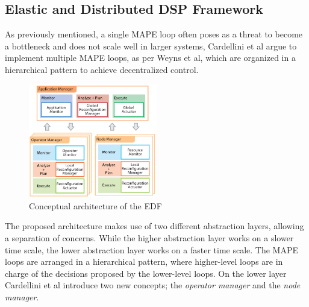         \subsection{Elastic and Distributed DSP Framework}
        \label{sub:edf}
        As previously mentioned, a single MAPE loop often poses as a threat to become a bottleneck and does not scale well in larger systems\cite{cardellini}\cite{Cheng:2009:SES:1573856.1573858},
        Cardellini et al argue to implement multiple MAPE loops, as per Weyns et al\cite{Weyns2013}, which are organized in a hierarchical pattern to achieve decentralized control.
        \begin{figure}[hbt]
            \centering
            \includegraphics[width=0.5\textwidth]{Bilder/hierarchical.png}
            \caption{
                    Conceptual architecture of the EDF\cite{cardellini}
            }
            \label{fig:hierarchical}
        \end{figure}
        The proposed architecture makes use of two different abstraction layers, allowing a separation of concerns. 
        While the higher abstraction layer works on a slower time scale, the lower abstraction layer works on a faster time scale.
        The MAPE loops are arranged in a hierarchical pattern, where higher-level loops are in charge of the decisions proposed by the lower-level loops.
        On the lower layer Cardellini et al introduce two new concepts; the \textit{operator manager} and the \textit{node manager}.


